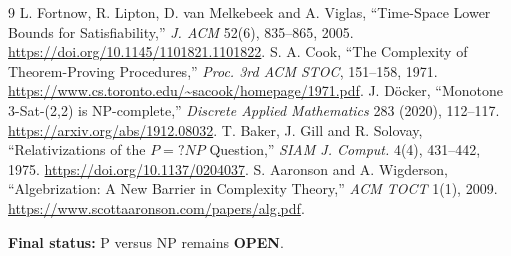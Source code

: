 \documentclass[11pt]{article}
\newcommand{\OPEN}{\textbf{OPEN}}
\begin{document}
\begin{thebibliography}{9}
 L. Fortnow, R. Lipton, D. van Melkebeek and A. Viglas,
``Time-Space Lower Bounds for Satisfiability,'' \emph{J. ACM} 52(6),
835--865, 2005. \url{https://doi.org/10.1145/1101821.1101822}.
 S. A. Cook, ``The Complexity of Theorem-Proving
Procedures,'' \emph{Proc. 3rd ACM STOC}, 151--158, 1971.
\url{https://www.cs.toronto.edu/~sacook/homepage/1971.pdf}.
 J. D\"ocker, ``Monotone 3-Sat-(2,2) is NP-complete,''
\emph{Discrete Applied Mathematics} 283 (2020), 112--117.
\url{https://arxiv.org/abs/1912.08032}.
 T. Baker, J. Gill and R. Solovay,
``Relativizations of the $P=?NP$ Question,'' \emph{SIAM J. Comput.} 4(4),
431--442, 1975. \url{https://doi.org/10.1137/0204037}.
 S. Aaronson and A. Wigderson,
``Algebrization: A New Barrier in Complexity Theory,'' \emph{ACM TOCT}
1(1), 2009. \url{https://www.scottaaronson.com/papers/alg.pdf}.
\end{thebibliography}

\noindent\textbf{Final status:} P versus NP remains \OPEN.

\end{document}
